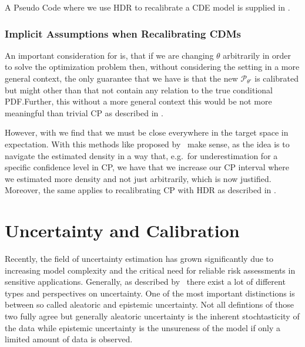 A Pseudo Code where we use HDR to recalibrate a CDE model is supplied in .

\subsubsection{Implicit Assumptions when Recalibrating CDMs}\label{sec:implicit_assumptions_cde}

An important consideration for  is, that if we are changing $\theta$ arbitrarily in order to solve the optimization problem then, without considering the setting in a more general context, the only guarantee that we have is that the new $\mathscr{P}_{\theta'}$ is calibrated but might other than that not contain any relation to the true conditional PDF.\@ Further, this without a more general context this would be not more meaningful than trivial CP as described in .

However, with  we find that we must be close everywhere in the target space in expectation. With this methods like proposed by~\cite{sesia2021conformal} make sense, as the idea is to navigate the estimated density in a way that, e.g.\ for underestimation for a specific confidence level in CP, we have that we increase our CP interval where we estimated more density and not just arbitrarily, which is now justified. Moreover, the same applies to recalibrating CP with HDR as described in .

\section{Uncertainty and Calibration}\label{sec:uncertainty_calibration}

Recently, the field of uncertainty estimation has grown significantly due to increasing model complexity and the critical need for reliable risk assessments in sensitive applications. Generally, as described by~\cite{hullermeier_aleatoric_2021} there exist a lot of different types and perspectives on uncertainty. One of the most important distinctions is between so called aleatoric and epistemic uncertainty. Not all defintions of those two fully agree but generally aleatoric uncertainty is the inherent stochtasticity of the data while epistemic uncertainty is the unsureness of the model if only a limited amount of data is observed.

